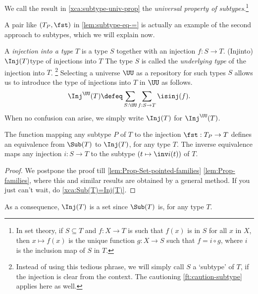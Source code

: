 We call the result in \cref{xca:subtype-univ-prop} the 
\emph{universal property of subtypes}.\footnote{%
In set theory, if $S\subseteq T$ and $f: X\to T$ is such that
$f(x)$ is in $S$ for all $x$ in $X$, then $x\mapsto f(x)$ is the
unique function $g: X\to S$ such that $f=i\circ g$, where $i$ is the
inclusion map of $S$ in $T$.}

A pair like $(T_P,\fst)$ in \cref{lem:subtype-eq-=} is actually an 
example of the second approach to subtypes, which we will explain now.  

\begin{definition}\label{def:injtype}
  A \emph{injection into a type} $T$
  is a type $S$ together with an injection $f : S \to T$.%
  \glossary(Injinto){$\protect\Inj(T)$}{type of injections into $T$}
  The type $S$ is called the \emph{underlying type} of the injection into $T$.%
  \footnote{Instead of using this tedious phrase, we will simply call $S$
  a `subtype' of $T$, if the injection is clear from the context.
  The cautioning \cref{ft:caution-subtype} applies here as well.}
  Selecting a universe $\UU$ as a repository for such types $S$ allows
  us to introduce the type of injections into $T$ in $\UU$ as follows.
  \[
  \Inj^\UU(T) \defeq \sum_{S:\UU}\sum_{f:S\to T}\isinj(f).
  \]
  When no confusion can arise, we simply write $\Inj(T)$ for $\Inj^\UU(T)$.
\end{definition}

\begin{lemma}\label{lem:Sub(T)=Inj(T)}
The function mapping any subtype $P$ of $T$ to the injection 
$\fst: T_P\to T$ defines an
equivalence from $\Sub(T)$ to $\Inj(T)$, for any type $T$.
The inverse equivalence maps any injection $i:S\to T$ to 
the subtype $(t\mapsto \inv i (t))$ of $T$.
\end{lemma}
\begin{proof}
We postpone the proof till \cref{lem:Prop-Set-pointed-families}
\ref{lem:Prop-families}, where this and similar results are obtained 
by a general method. If you just can't wait, do \cref{xca:Sub(T)=Inj(T)}.
\end{proof}

As a consequence, $\Inj(T)$ is a set since $\Sub(T)$ is, for any type $T$.
\addtocounter{footnote}{-1}

